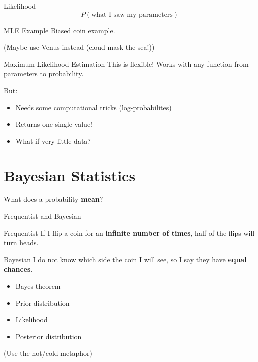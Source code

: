 \documentclass[aspectratio=169,xcolor=svgnames]{beamer}
\begin{document}
\begin{frame}{Likelihood}
  \begin{equation*}
    P(\text{what I saw}|\text{my parameters})
  \end{equation*}
\end{frame}

\begin{frame}{MLE Example}
Biased coin example.

(Maybe use Venus instead (cloud mask the sea!))
\end{frame}

\begin{frame}{Maximum Likelihood Estimation}
  This is flexible!
  Works with any function from parameters to probability.

  But:
  \begin{itemize}
    \item Needs some computational tricks (log-probabilites)
    \item Returns one single value!
    \item What if very little data?
  \end{itemize}
\end{frame}

\section{Bayesian Statistics}

\begin{frame}
What does a probability \textbf{mean}?
\end{frame}

\begin{frame}{Frequentist and Bayesian}
  \begin{block}{Frequentist}
    If I flip a coin for an \textbf{infinite number of times},
    half of the flips will turn heads.
  \end{block}

  \begin{block}{Bayesian}
    I do not know which side the coin I will see,
    so I say they have \textbf{equal chances}.
  \end{block}
\end{frame}

\begin{frame}
  \begin{itemize}
  \item Bayes theorem
  \item Prior distribution
  \item Likelihood
  \item Posterior distribution
  \end{itemize}

  (Use the hot/cold metaphor)
\end{frame}
\end{document}
